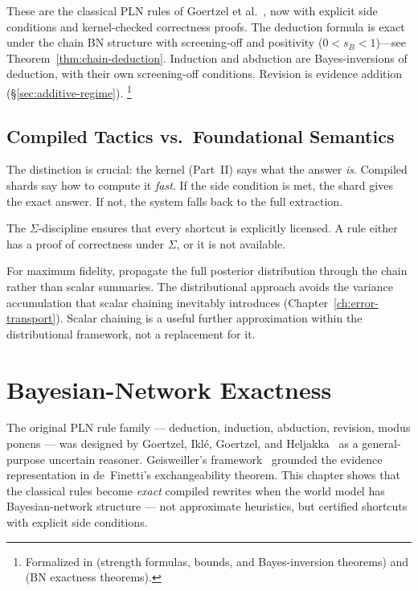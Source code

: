 \documentclass[11pt,openany]{report}
\begin{document}
\noindent
These are the classical PLN rules of Goertzel et
al.~\cite{goertzel2009pln}, now with explicit side conditions and
kernel-checked correctness proofs.  The deduction formula is exact
under the chain BN structure with screening-off and positivity
($0 < s_B < 1$)---see Theorem~\ref{thm:chain-deduction}.
Induction and abduction are
Bayes-inversions of deduction, with their own screening-off
conditions.  Revision is evidence addition
(\S\ref{sec:additive-regime}).%
\footnote{Formalized in 
(strength formulas, bounds, and Bayes-inversion theorems) and
 (BN exactness
theorems).}

\section{Compiled Tactics vs.\ Foundational Semantics}

The distinction is crucial: the kernel (Part~II) says what the answer
\emph{is}.  Compiled shards say how to compute it \emph{fast}.  If
the side condition is met, the shard gives the exact answer.  If not,
the system falls back to the full extraction.

The $\Sigma$-discipline ensures that every shortcut is explicitly
licensed.  A rule either has a proof of correctness under $\Sigma$,
or it is not available.

For maximum fidelity, propagate the full posterior distribution
through the chain rather than scalar summaries.  The distributional
approach avoids the variance accumulation that scalar chaining
inevitably introduces (Chapter~\ref{ch:error-transport}).  Scalar
chaining is a useful further approximation within the distributional
framework, not a replacement for it.


\chapter{Bayesian-Network Exactness}
\label{ch:bn-models}

The original PLN rule family --- deduction, induction, abduction,
revision, modus ponens --- was designed by Goertzel, Iklé, Goertzel,
and Heljakka~\cite{goertzel2009pln} as a general-purpose uncertain
reasoner.  Geisweiller's \nuPLN{} framework~\cite{nuPLN2026} grounded
the evidence representation in de~Finetti's exchangeability theorem.
This chapter shows that the classical rules become \emph{exact}
compiled rewrites when the world model has Bayesian-network structure
--- not approximate heuristics, but certified shortcuts with explicit
side conditions.
\end{document}
